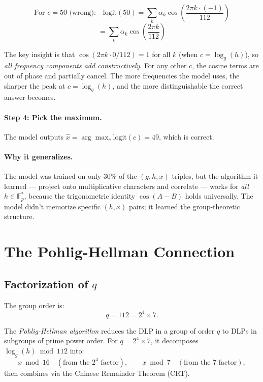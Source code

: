 \documentclass[11pt]{article}
\newcommand{\Fps}{\mathbb{F}_p^*}
\newcommand{\logg}{\log_g}
\begin{document}
\begin{equation}
\text{For } c = 50 \text{ (wrong):} \quad \text{logit}(50) = \sum_k \alpha_k \cos\!\left(\frac{2\pi k \cdot (-1)}{112}\right)
\end{equation}
\begin{equation}
    = \sum_k \alpha_k \cos\!\left(\frac{2\pi k}{112}\right)
\end{equation}

The key insight is that $\cos(2\pi k \cdot 0 / 112) = 1$ for all $k$ (when $c = \logg(h)$), so \emph{all frequency components add constructively}. For any other $c$, the cosine terms are out of phase and partially cancel. The more frequencies the model uses, the sharper the peak at $c = \logg(h)$, and the more distinguishable the correct answer becomes.

\paragraph{Step 4: Pick the maximum.} The model outputs $\hat{x} = \arg\max_c \text{logit}(c) = 49$, which is correct.

\paragraph{Why it generalizes.} The model was trained on only 30\% of the $(g, h, x)$ triples, but the algorithm it learned — project onto multiplicative characters and correlate — works for \emph{all} $h \in \Fps$, because the trigonometric identity $\cos(A - B)$ holds universally. The model didn't memorize specific $(h, x)$ pairs; it learned the group-theoretic structure.


\section{The Pohlig-Hellman Connection}

\subsection{Factorization of $q$}

The group order is:
\begin{equation}
    q = 112 = 2^4 \times 7.
\end{equation}

The \emph{Pohlig-Hellman algorithm} \citep{pohlig1978improved} reduces the DLP in a group of order $q$ to DLPs in subgroups of prime power order. For $q = 2^4 \times 7$, it decomposes $\logg(h) \bmod 112$ into:
\begin{equation}
    x \bmod 16 \quad (\text{from the } 2^4 \text{ factor}), \qquad x \bmod 7 \quad (\text{from the } 7 \text{ factor}),
\end{equation}
then combines via the Chinese Remainder Theorem (CRT).
\end{document}
